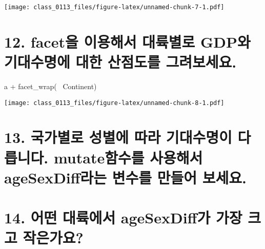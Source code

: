 \documentclass[a4paper]{article}
\newenvironment{Shaded}{}{}
\newcommand{\KeywordTok}[1]{\textcolor[rgb]{0.00,0.00,1.00}{#1}}
\newcommand{\DataTypeTok}[1]{#1}
\newcommand{\StringTok}[1]{\textcolor[rgb]{0.00,0.50,0.50}{#1}}
\newcommand{\OperatorTok}[1]{#1}
\newcommand{\NormalTok}[1]{#1}
\begin{document}
\texttt{[image: class\_0113\_files/figure-latex/unnamed-chunk-7-1.pdf]}

\section{12. facet을 이용해서 대륙별로 GDP와 기대수명에 대한 산점도를
그려보세요.}\label{facet---gdp----.}

\begin{Shaded}
\begin{Highlighting}[]
\NormalTok{a }\OperatorTok{+}\StringTok{ }\KeywordTok{facet_wrap}\NormalTok{(}\OperatorTok{~}\StringTok{ }\NormalTok{Continent)}
\end{Highlighting}
\end{Shaded}

\texttt{[image: class\_0113\_files/figure-latex/unnamed-chunk-8-1.pdf]}

\section{13. 국가별로 성별에 따라 기대수명이 다릅니다. mutate함수를
사용해서 ageSexDiff라는 변수를 만들어
보세요.}\label{----.-mutate--agesexdiff---.}

\begin{Shaded}
\end{Shaded}

\section{14. 어떤 대륙에서 ageSexDiff가 가장 크고
작은가요?}\label{--agesexdiff---}

\begin{Shaded}
\end{Shaded}
\end{document}
